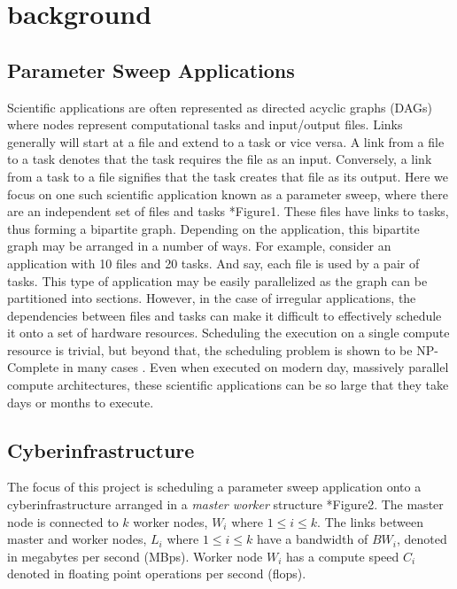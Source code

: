 \section{background} \label{sec:background}

\subsection{Parameter Sweep Applications}

Scientific applications are often represented as directed acyclic graphs (DAGs)
where nodes represent computational tasks and input/output files. Links
generally will start at a file and extend to a task or vice versa. A link from a
file to a task denotes that the task requires the file as an input. Conversely,
a link from a task to a file signifies that the task creates that file as its
output. Here we focus on one such scientific application known as a parameter
sweep, where there are an independent set of files and tasks *Figure1. These
files have links to tasks, thus forming a bipartite graph. Depending on the
application, this bipartite graph may be arranged in a number of ways. For
example, consider an application with 10 files and 20 tasks. And say, each file
is used by a pair of tasks. This type of application may be easily parallelized
as the graph can be partitioned into sections. However, in the case of irregular
applications, the dependencies between files and tasks can make it difficult to
effectively schedule it onto a set of hardware resources. Scheduling the
execution on a single compute resource is trivial, but beyond that, the
scheduling problem is shown to be NP-Complete in many cases
\cite{Giersch-task-sharing-files-04}. Even when executed on modern day,
massively parallel compute architectures, these scientific applications can be
so large that they take days or months to execute.

\subsection{Cyberinfrastructure}

The focus of this project is scheduling a parameter sweep application onto a
cyberinfrastructure arranged in a \textit{master worker} structure *Figure2. The
master node is connected to $k$ worker nodes, $W_i$ where $1 \leq i \leq k$.
The links between master and worker nodes, $L_i$ where $1 \leq i \leq k$ have
a bandwidth of $BW_i$, denoted in megabytes per second (MBps).
Worker node $W_i$ has a compute speed $C_i$ denoted in floating point operations
per second (flops).

